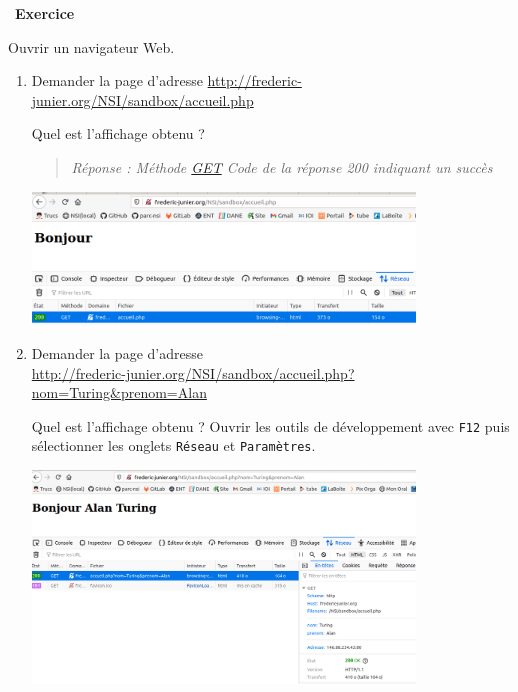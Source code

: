 \documentclass[
  11pt,
]{article}
\newcommand{\passthrough}[1]{#1}
\newcounter{exo}
\newenvironment{exercice}[1]
{\par \medskip   \addtocounter{exo}{1} \noindent  
\begin{bclogo}[arrondi =0.1,   noborder = true, logo=\bccrayon, marge=4]{~\textbf{Exercice} \textbf{\theexo} {\itshape #1} }  \par}
{
\end{bclogo}
 \par \bigskip }
\newcounter{def}
\begin{document}
\begin{exercice}{}

Ouvrir un navigateur Web.

\begin{enumerate}
\def\labelenumi{\arabic{enumi}.}
\item
  Demander la page d'adresse
  \href{https://frederic-junier.org/NSI/sandbox/accueil.php}{http://frederic-junier.org/NSI/sandbox/accueil.php}

  Quel est l'affichage obtenu ?

  \begin{quote}
  \emph{Réponse : Méthode \url{GET} Code de la réponse 200 indiquant un
  succès}
  \end{quote}

  \includegraphics[width=0.8\textwidth,height=\textheight]{images/bonjour.png}\\
\item
  Demander la page d'adresse\\
  \href{https://frederic-junier.org/NSI/sandbox/accueil.php?nom=Turing\&prenom=Alan}{http://frederic-junier.org/NSI/sandbox/accueil.php?nom=Turing\&prenom=Alan}

  Quel est l'affichage obtenu ? Ouvrir les outils de développement avec
  \passthrough{\lstinline!F12!} puis sélectionner les onglets
  \passthrough{\lstinline!Réseau!} et
  \passthrough{\lstinline!Paramètres!}.

  \includegraphics[width=0.8\textwidth,height=\textheight]{images/bonjour_get.png}\\
\end{enumerate}


\end{exercice}
\end{document}
